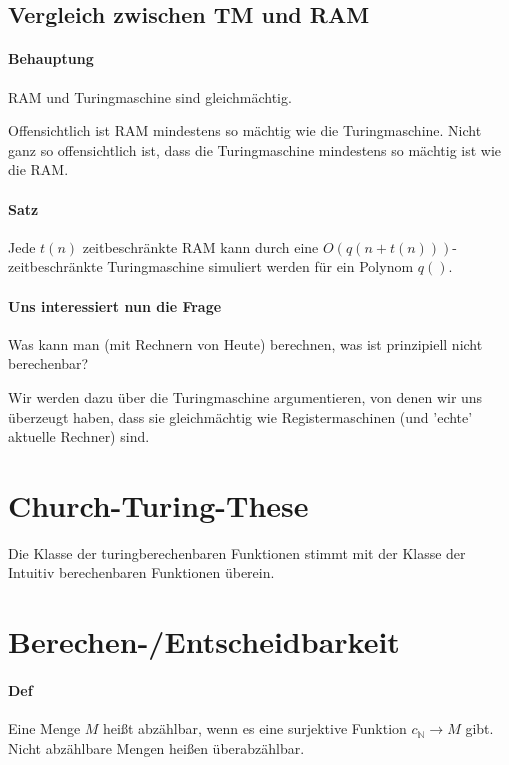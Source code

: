 \subsection{Vergleich zwischen TM und RAM}

\paragraph*{Behauptung} RAM und Turingmaschine sind gleichmächtig.

\par\medskip Offensichtlich ist RAM mindestens so mächtig wie die Turingmaschine. Nicht ganz so offensichtlich ist, dass die Turingmaschine mindestens so mächtig ist wie die RAM.\par\medskip

\paragraph*{Satz} Jede $t(n)$ zeitbeschränkte RAM kann durch eine $O(q(n+t(n)))$-zeitbeschränkte Turingmaschine simuliert werden für ein Polynom $q()$.

\paragraph*{Uns interessiert nun die Frage} Was kann man (mit Rechnern von Heute) berechnen, was ist prinzipiell nicht berechenbar?

\par\medskip Wir werden dazu über die Turingmaschine argumentieren, von denen wir uns überzeugt haben, dass sie gleichmächtig wie Registermaschinen (und 'echte' aktuelle Rechner) sind.\par\medskip

\section{Church-Turing-These}

Die Klasse der turingberechenbaren Funktionen stimmt mit der Klasse der Intuitiv berechenbaren Funktionen überein.

\section{Berechen-/Entscheidbarkeit}
\paragraph*{Def} Eine Menge $M$ heißt abzählbar, wenn es eine surjektive Funktion $c_\mathbb{N}\rightarrow M$ gibt. Nicht abzählbare Mengen heißen überabzählbar.

